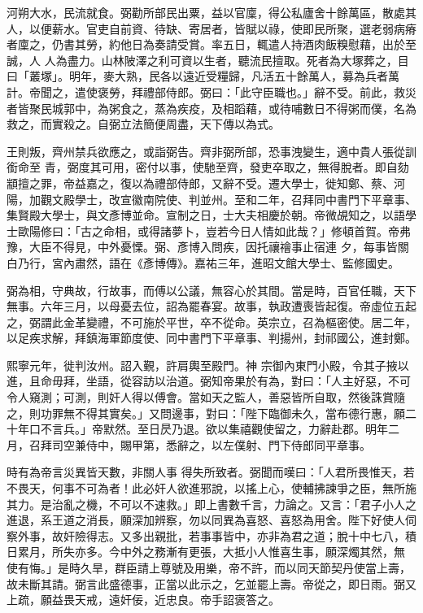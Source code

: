 \begin{pinyinscope}
 河朔大水，民流就食。弼勸所部民出粟，益以官廩，得公私廬舍十餘萬區，散處其人，以便薪水。官吏自前資、待缺、寄居者，皆賦以祿，使即民所聚，選老弱病瘠者廩之，仍書其勞，約他日為奏請受賞。率五日，輒遣人持酒肉飯糗慰藉，出於至誠，人
 人為盡力。山林陂澤之利可資以生者，聽流民擅取。死者為大塚葬之，目曰「叢塚」。明年，麥大熟，民各以遠近受糧歸，凡活五十餘萬人，募為兵者萬計。帝聞之，遣使褒勞，拜禮部侍郎。弼曰：「此守臣職也。」辭不受。前此，救災者皆聚民城郭中，為粥食之，蒸為疾疫，及相蹈藉，或待哺數日不得粥而僕，名為救之，而實殺之。自弼立法簡便周盡，天下傳以為式。



 王則叛，齊州禁兵欲應之，或詣弼告。齊非弼所部，恐事洩變生，適中貴人張從訓銜命至
 青，弼度其可用，密付以事，使馳至齊，發吏卒取之，無得脫者。即自劾顓擅之罪，帝益嘉之，復以為禮部侍郎，又辭不受。遷大學士，徙知鄭、蔡、河陽，加觀文殿學士，改宣徽南院使、判並州。至和二年，召拜同中書門下平章事、集賢殿大學士，與文彥博並命。宣制之日，士大夫相慶於朝。帝微覘知之，以語學士歐陽修曰：「古之命相，或得諸夢卜，豈若今日人情如此哉？」修頓首賀。帝弗豫，大臣不得見，中外憂慄。弼、彥博入問疾，因托禳禬事止宿連
 夕，每事皆關白乃行，宮內肅然，語在《彥博傳》。嘉祐三年，進昭文館大學士、監修國史。



 弼為相，守典故，行故事，而傅以公議，無容心於其間。當是時，百官任職，天下無事。六年三月，以母憂去位，詔為罷春宴。故事，執政遭喪皆起復。帝虛位五起之，弼謂此金革變禮，不可施於平世，卒不從命。英宗立，召為樞密使。居二年，以足疾求解，拜鎮海軍節度使、同中書門下平章事、判揚州，封祁國公，進封鄭。



 熙寧元年，徙判汝州。詔入覲，許肩輿至殿門。神
 宗御內東門小殿，令其子掖以進，且命毋拜，坐語，從容訪以治道。弼知帝果於有為，對曰：「人主好惡，不可令人窺測；可測，則奸人得以傅會。當如天之監人，善惡皆所自取，然後誅賞隨之，則功罪無不得其實矣。」又問邊事，對曰：「陛下臨御未久，當布德行惠，願二十年口不言兵。」帝默然。至日昃乃退。欲以集禧觀使留之，力辭赴郡。明年二月，召拜司空兼侍中，賜甲第，悉辭之，以左僕射、門下侍郎同平章事。



 時有為帝言災異皆天數，非關人事
 得失所致者。弼聞而嘆曰：「人君所畏惟天，若不畏天，何事不可為者！此必奸人欲進邪說，以搖上心，使輔拂諫爭之臣，無所施其力。是治亂之機，不可以不速救。」即上書數千言，力論之。又言：「君子小人之進退，系王道之消長，願深加辨察，勿以同異為喜怒、喜怒為用舍。陛下好使人伺察外事，故奸險得志。又多出親批，若事事皆中，亦非為君之道；脫十中七八，積日累月，所失亦多。今中外之務漸有更張，大抵小人惟喜生事，願深燭其然，無
 使有悔。」是時久旱，群臣請上尊號及用樂，帝不許，而以同天節契丹使當上壽，故未斷其請。弼言此盛德事，正當以此示之，乞並罷上壽。帝從之，即日雨。弼又上疏，願益畏天戒，遠奸佞，近忠良。帝手詔褒答之。




\end{pinyinscope}
